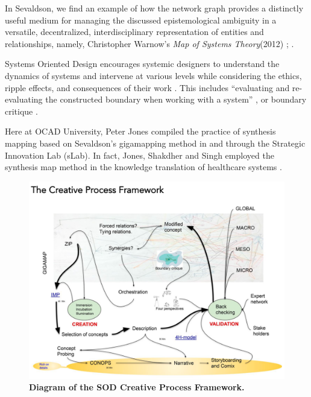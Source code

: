 In Sevaldson, we find an example of how the network graph provides a distinctly useful medium for managing the discussed epistemological ambiguity in a versatile, decentralized, interdisciplinary representation of entities and relationships, namely, Christopher Warnow's \textit{Map of Systems Theory}(2012) \citep{warnow_map_2012}; \citep[p. 125]{sevaldson_designing_2022}. 

Systems Oriented Design encourages systemic designers to understand the dynamics of systems and intervene at various levels while considering the ethics, ripple effects, and consequences of their work \citep[p. 95-96]{sevaldson_designing_2022}. This includes “evaluating and re-evaluating the constructed boundary when working with a system” \citep[p. 146]{sevaldson_designing_2022}, or boundary critique \citep{midgley_theory_1998}.

Here at OCAD University, Peter Jones compiled the practice of synthesis mapping based on Sevaldson’s gigamapping method \citep[p. 129]{jones_synthesis_2017} in and through the Strategic Innovation Lab (sLab). In fact, Jones, Shakdher and Singh employed the synthesis map method in the knowledge translation of healthcare systems \citep[p. 129]{jones_synthesis_2017}. 
 \clearpage

 \FloatBarrier
\begin{figure}[h]
    \centering
    \includegraphics[width=0.65\linewidth]{figures/f15.png}
    \caption[Diagram of the SOD Creative Process Framework]{\textbf{Diagram of the SOD Creative Process Framework.} \citep[p. 312]{sevaldson_designing_2022} }
    \label{fig:15}
\end{figure}

